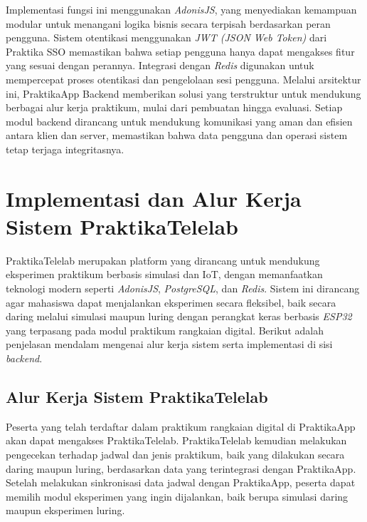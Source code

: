 Implementasi fungsi ini menggunakan \emph{AdonisJS}, yang menyediakan kemampuan modular untuk menangani logika bisnis secara terpisah berdasarkan peran pengguna. Sistem otentikasi menggunakan \emph{JWT (JSON Web Token) } dari Praktika SSO memastikan bahwa setiap pengguna hanya dapat mengakses fitur yang sesuai dengan perannya. Integrasi dengan \emph{Redis} digunakan untuk mempercepat proses otentikasi dan pengelolaan sesi pengguna. Melalui arsitektur ini, PraktikaApp Backend memberikan solusi yang terstruktur untuk mendukung berbagai alur kerja praktikum, mulai dari pembuatan hingga evaluasi. Setiap modul backend dirancang untuk mendukung komunikasi yang aman dan efisien antara klien dan server, memastikan bahwa data pengguna dan operasi sistem tetap terjaga integritasnya.

\section{Implementasi dan Alur Kerja Sistem PraktikaTelelab}
PraktikaTelelab merupakan platform yang dirancang untuk mendukung eksperimen praktikum berbasis simulasi dan IoT, dengan memanfaatkan teknologi modern seperti \emph{AdonisJS}, \emph{PostgreSQL}, dan \emph{Redis}. Sistem ini dirancang agar mahasiswa dapat menjalankan eksperimen secara fleksibel, baik secara daring melalui simulasi maupun luring dengan perangkat keras berbasis \emph{ESP32} yang terpasang pada modul praktikum rangkaian digital. Berikut adalah penjelasan mendalam mengenai alur kerja sistem serta implementasi di sisi \emph{backend}.

\subsection{Alur Kerja Sistem PraktikaTelelab}
Peserta yang telah terdaftar dalam praktikum rangkaian digital di PraktikaApp akan dapat mengakses PraktikaTelelab. PraktikaTelelab kemudian melakukan pengecekan terhadap jadwal dan jenis praktikum, baik yang dilakukan secara daring maupun luring, berdasarkan data yang terintegrasi dengan PraktikaApp. Setelah melakukan sinkronisasi data jadwal dengan PraktikaApp, peserta dapat memilih modul eksperimen yang ingin dijalankan, baik berupa simulasi daring maupun eksperimen luring. 

